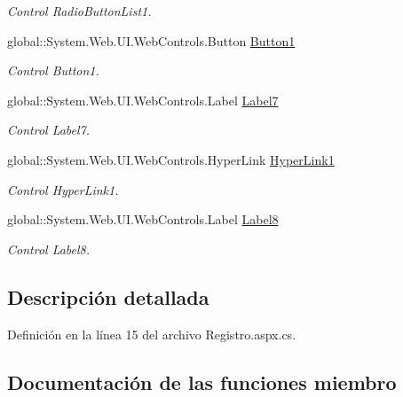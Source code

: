 \begin{DoxyCompactItemize}
\begin{DoxyCompactList}\small\item\em Control Radio\+Button\+List1. \end{DoxyCompactList}\item 
global\+::\+System.\+Web.\+U\+I.\+Web\+Controls.\+Button \mbox{\hyperlink{classInicio_1_1Registro_aa0ba82a780d379b638a877027de7a61b}{Button1}}
\begin{DoxyCompactList}\small\item\em Control Button1. \end{DoxyCompactList}\item 
global\+::\+System.\+Web.\+U\+I.\+Web\+Controls.\+Label \mbox{\hyperlink{classInicio_1_1Registro_a1f3fd3c1774cb311690a4246ba5aca66}{Label7}}
\begin{DoxyCompactList}\small\item\em Control Label7. \end{DoxyCompactList}\item 
global\+::\+System.\+Web.\+U\+I.\+Web\+Controls.\+Hyper\+Link \mbox{\hyperlink{classInicio_1_1Registro_aa4f71bea88748ad5dfc036a400cb4537}{Hyper\+Link1}}
\begin{DoxyCompactList}\small\item\em Control Hyper\+Link1. \end{DoxyCompactList}\item 
global\+::\+System.\+Web.\+U\+I.\+Web\+Controls.\+Label \mbox{\hyperlink{classInicio_1_1Registro_a8f64d7bc53c3f17751f32a57cef78ddb}{Label8}}
\begin{DoxyCompactList}\small\item\em Control Label8. \end{DoxyCompactList}\end{DoxyCompactItemize}


\subsection{Descripción detallada}


Definición en la línea 15 del archivo Registro.\+aspx.\+cs.



\subsection{Documentación de las funciones miembro}
\mbox{\label{classInicio_1_1Registro_a5fd08d11649d5319490065cdf317cdd0}} 
